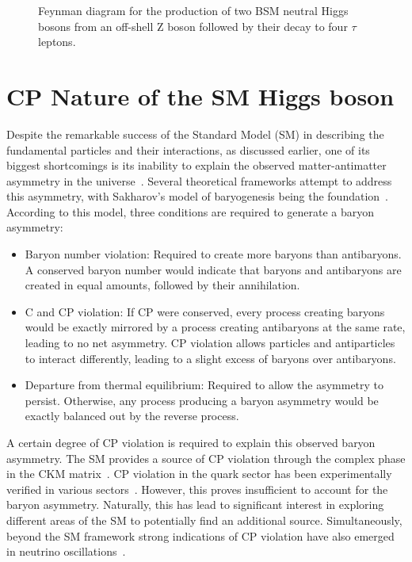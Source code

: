 \begin{figure}[h]
\centering

\caption{Feynman diagram for the production of two BSM neutral Higgs bosons from an off-shell Z boson followed by their decay to four $\tau$ leptons.}
\label{Figure:Chapter2_Feynman4tau}
\end{figure}

\section{CP Nature of the SM Higgs boson}

Despite the remarkable success of the Standard Model (SM) in describing the fundamental particles and their interactions, as discussed earlier, one of its biggest shortcomings is its inability to explain the observed matter-antimatter asymmetry in the universe~\cite{MatterAntimatter}. Several theoretical frameworks attempt to address this asymmetry, with Sakharov's model of baryogenesis being the foundation~\cite{Sakharov}. According to this model, three conditions are required to generate a baryon asymmetry:

\begin{itemize}
    \item Baryon number violation: Required to create more baryons than antibaryons. A conserved baryon number would indicate that baryons and antibaryons are created in equal amounts, followed by their annihilation.
    \item C and CP violation: If CP were conserved, every process creating baryons would be exactly mirrored by a process creating antibaryons at the same rate, leading to no net asymmetry. CP violation allows particles and antiparticles to interact differently, leading to a slight excess of baryons over antibaryons.
    \item Departure from thermal equilibrium: Required to allow the asymmetry to persist. Otherwise, any process producing a baryon asymmetry would be exactly balanced out by the reverse process.
\end{itemize}

A certain degree of CP violation is required to explain this observed baryon asymmetry. The SM provides a source of CP violation through the complex phase in the CKM matrix~\cite{CKM_1,CKM_2}. CP violation in the quark sector has been experimentally verified in various sectors~\cite{CP_QuarkSector_1, CP_QuarkSector_2, CP_QuarkSector_3, CP_QuarkSector_4, 
CP_QuarkSector_5, CP_QuarkSector_6, CP_QuarkSector_7, CP_QuarkSector_8, 
CP_QuarkSector_9, CP_QuarkSector_10, CP_QuarkSector_11, CP_QuarkSector_12, 
CP_QuarkSector_13, CP_QuarkSector_14}. However, this proves insufficient to account for the baryon asymmetry. 
Naturally, this has lead to significant interest in exploring different areas of the SM to potentially find an additional source. Simultaneously, beyond the SM framework strong indications of CP violation have also emerged in neutrino oscillations~\cite{CP_Neutrino_Oscillations}. 


